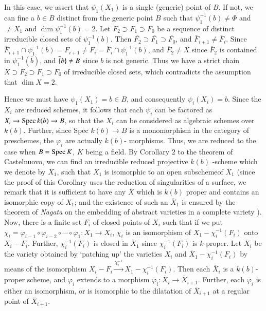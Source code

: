 In this case, we assert that $\psi_1 (X_1)$ is a single (generic)
point of $B$. If not, we can fine a $b \in B$ distinct from the
generic point $B$ such that $\psi_1^{-1} (b) \neq \Phi $ and  $\neq
X_1$ and $\dim \psi_1^{-1}(b) = 2$. Let $F_2 \supset F_1\supset F_0$
be a sequence of distinct irreducible closed sets of
$\psi_1^{-1}(b)$. Then $\overline{F_2} \supset \overline{F_1} \supset
\overline{F_0}$, and $\bar{F}_{i+1} \neq \overline{F}_i$. Since
$\overline{F}_{i+1} \cap \psi^{-1}_1 (b) = F_{i+1} \neq F_i =
\overline{F}_i \cap \psi_1^{-1}(b) $, and  $\overline{F}_2 \neq X$ 
since $\overline{F}_2$ is contained in $\psi^{-1}_1 (\overline{b})$,
and $\overline\{b\} \neq B$ since $b$ is not generic. Thus we have a
strict chain $ X \supset \overline{F}_2 \supset \overline{F}_1 \supset
\overline{F}_0 $ of irreducible closed sets, which contradicts the
assumption that $\dim X=2$. 
 
 Hence we must have $\psi_1(X_1) = b \in B $, and consequently
 $\psi_i(X_i) = b$. Since the $X_i$ are reduced schemes, it follows
 that each $\psi_i$ can be factored as $X_i \rightarrow \operatorname{Spec} k(b)
 \rightarrow B$, so that the $X_i$  can be considered as algebraic
 schemes over $k(b)$. Further, since Spec $k(b) \rightarrow B$ is a
 monomorphism in the category of preschemes, the $\varphi_i$ are
 actually $k(b)$- morphisms. Thus, we are reduced to the case when
 $B=\operatorname{Spec} K$, $K$ being a field. By Corollary $2$ to the theorem of
 Castelnuovo, we can find an irreducible reduced projective $k(b)$
 -scheme which we denote by $\overline{X}_1$, such that $X_1$ is
 isomorphic to an open subscheme\pageoriginale of $\overline{X}_1$
 (since the proof 
 of this Corollary uses the reduction of singularities of a surface,
 we remark that it is sufficient to have any $\overline{X}$ which is
 $k(b)$ proper and contains an isomorphic copy of $X_1$; and the
 existence of such an $\overline{X}_1$ is ensured by the theorem of
 \textit{ Nagata } on the embedding of abstract varieties in a
 complete variety \cite{key19}). Now, there is a finite set $F_i$ of closed
 points of $X_i$ such that if we put $\chi_i = \varphi_{i-1} \circ
 \varphi_{i-2} \circ \cdots \circ \varphi_1 : X_1 \to X_i$, $\chi_i$ is an
 isomorphism of $X_1 - \chi_i^{-1}(F_i) $ onto  $X_i - F_i$. Further,
 $\chi_i^{-1} (F_i)$ is closed in  $\overline{X}_1$ since
 $\chi_i^{-1}(F_i)$ is $k$-proper. Let $\overline{X}_i$  be the
 variety obtained by `patching up' the varieties $X_i$ and
 $\overline{X}_1- \chi_i^{-1}(F_i)$ by means of the isomorphism
 $X_i- F_i \xrightarrow{\chi_i^{-1}} X_1 - \chi_i^{-1} 
 (F_i)$. Then each $\overline{X}_i$ is a $k(b)$-proper scheme, and
 $\varphi_i$ extends to a morphism $\overline{\varphi}_i :
 \overline{X}_i \rightarrow \overline{X}_{i+1}$.  Further, each
 $\overline{\varphi}_i$ is either an  isomorphism, or is isomorphic to
 the dilatation of $\bar{X}_{i+1}$  at a regular point of
 $\bar{X}_{i+1}$. 
 
